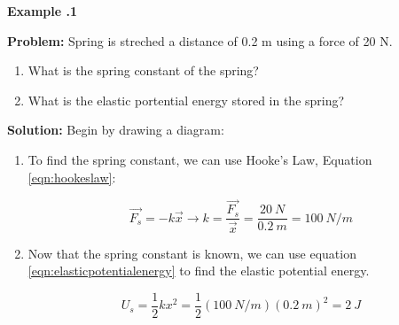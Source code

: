 	\begin{mdframed}[backgroundcolor=blue!10!white]
		\begin{center}
			
			
			\textbf{Example \thesection.1}	
		\end{center}
		
		\textbf{Problem: } Spring is streched a distance of 0.2 m using a force of 20 N.  
		\begin{enumerate}[label=(\alph*)]
			\item What is the spring constant of the spring?
			\item What is the elastic portential energy stored in the spring?
		\end{enumerate}
		\vspace{0.1in}
		
		\textbf{Solution:} 
		Begin by drawing a diagram:
		\vspace{0.1in}
		\begin{center}
			
		
		\end{center}
		
\begin{enumerate}[label=(\alph*)]
	\item To find the spring constant, we can use Hooke's Law, Equation \ref{eqn:hookeslaw}:
	
		\begin{equation*}
			\overrightarrow{F_s} = -k\vec{x} \longrightarrow k = \frac{\overrightarrow{F_s}}{\vec{x}} = \frac{\SI{20}{N}}{\SI{0.2}{m}} = \SI{100}{N/m}
		\end{equation*}
	
	\item Now that the spring constant is known, we can use equation \ref{eqn:elasticpotentialenergy} to find the elastic potential energy.  
	
			\begin{equation*}
		U_s = \frac{1}{2}kx^2 = \frac{1}{2}(\SI{100}{N/m})(\SI{0.2}{m})^2 = \SI{2}{J}
	\end{equation*}
\end{enumerate}
		
		
		
		
		
	\end{mdframed}
	

